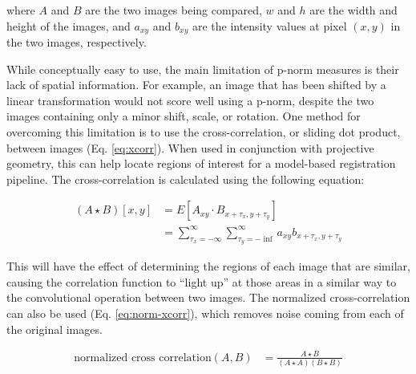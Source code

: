 where $A$ and $B$ are the two images being compared, $w$ and $h$ are the width and height of the images, and $a_{xy}$ and $b_{xy}$ are the intensity values at pixel $(x,y)$ in the two images, respectively.

While conceptually easy to use, the main limitation of p-norm measures is their lack of spatial information. For example, an image that has been shifted by a linear transformation would not score well using a p-norm, despite the two images containing only a minor shift, scale, or rotation. One method for overcoming this limitation is to use the cross-correlation, or sliding dot product, between images \cite{bendatRandomDataAnalysis2010,hannahComputerMatchingAreas1977} (Eq. \ref{eq:xcorr}). When used in conjunction with projective geometry, this can help locate regions of interest for a model-based registration pipeline. The cross-correlation is calculated using the following equation:

\begin{equation}
    \begin{aligned}
        (A \star B)[x,y] &= E[A_{xy} \cdot B_{x + \tau_x,y+\tau_y}] \\
        &= \sum_{\tau_x=-\infty}^{\infty}\sum_{\tau_y=-\inf}^{\infty}a_{xy}b_{x + \tau_x,y + \tau_y}
    \end{aligned}
    \label{eq:xcorr}
\end{equation}

This will have the effect of determining the regions of each image that are similar, causing the correlation function to ``light up'' at those areas in a similar way to the convolutional operation between two images. The normalized cross-correlation can also be used (Eq. \ref{eq:norm-xcorr}), which removes noise coming from each of the original images.

\begin{equation}
    \begin{aligned}
        \text{normalized cross correlation}(A,B) &= \frac{A \star B}{(A \star A)(B \star B)}
    \end{aligned}\label{eq:norm-xcorr}
\end{equation}

